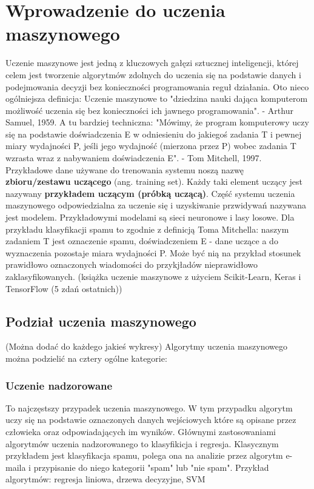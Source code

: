\documentclass[a4paper, 12pt]{article}
\begin{document}
    \section{Wprowadzenie do uczenia maszynowego}
    \indent Uczenie maszynowe jest jedną z kluczowych gałęzi sztucznej inteligencji, której celem jest tworzenie algorytmów zdolnych
    do uczenia się na podstawie danych i podejmowania decyzji bez konieczności programowania reguł działania. 
    Oto nieco ogólniejsza definicja: Uczenie maszynowe to "dziedzina nauki dająca komputerom możliwość uczenia się
    bez konieczności ich jawnego programowania". - Arthur Samuel, 1959. A tu bardziej techniczna:
    "Mówimy, że program komputerowy uczy się na podstawie doświadczenia E w odniesieniu do jakiegoś zadania T
    i pewnej miary wydajności P, jeśli jego wydajność (mierzona przez P) wobec zadania T wzrasta wraz z nabywaniem
    doświadczenia E". - Tom Mitchell, 1997. Przykładowe dane używane do trenowania systemu noszą nazwę
    \textbf{zbioru/zestawu uczącego} (ang. training set). Każdy taki element uczący jest nazywany 
    \textbf{przykładem uczącym (próbką uczącą)}. Część systemu uczenia maszynowego odpowiedzialna za uczenie się i uzyskiwanie 
    przwidywań nazywana jest modelem. Przykładowymi modelami są sieci neuronowe i lasy losowe. Dla przykładu klasyfikacji spamu to zgodnie z definicją Toma Mitchella: naszym
    zadaniem T jest oznaczenie spamu, doświadczeniem E - dane uczące a do wyznaczenia pozostaje miara wydajności P.
    Może być nią na przykład stosunek prawidłowo oznaczonych wiadomości do przykjładów nieprawidłowo zaklasyfikowanych.
    (książka uczenie maszynowe z użyciem Scikit-Learn, Keras i TensorFlow (5 zdań ostatnich))
    
    \subsection{Podział uczenia maszynowego} (Można dodać do każdego jakieś wykresy)
    Algorytmy uczenia maszynowego można podzielić na cztery ogólne kategorie:
    
    \subsubsection{Uczenie nadzorowane}
    To najczęstszy przypadek uczenia maszynowego. W tym przypadku algorytm uczy się na podstawie
    oznaczonych danych wejściowych które są opisane przez człowieka oraz odpowiadających im wyników.
    Głównymi zastosowaniami algorytmów uczenia nadzorowanego to klasyfikicja i regresja. Klasycznym przykładem
    jest klasyfikacja spamu, polega ona na analizie przez algorytm e-maila i przypisanie do niego kategorii "spam" 
    lub "nie spam". Przykład algorytmów: regresja liniowa, drzewa decyzyjne, SVM
\end{document}
